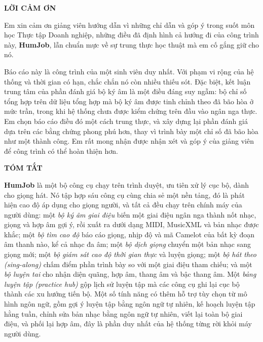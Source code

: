\documentclass[12pt,a4paper]{article}
\begin{document}
\newpage
\begin{center}
    \textbf{\large LỜI CẢM ƠN}
\end{center}

Em xin cảm ơn giảng viên hướng dẫn vì những chỉ dẫn và góp ý trong suốt môn học
Thực tập Doanh nghiệp, những điều đã định hình cả hướng đi của công trình này,
\textbf{HumJob}, lẫn chuẩn mực về sự trung thực học thuật mà em cố gắng giữ cho nó.

Báo cáo này là công trình của một sinh viên duy nhất. Với phạm vi rộng của hệ
thống và thời gian có hạn, chắc chắn nó còn nhiều thiếu sót. Đặc biệt, kết luận
trung tâm của phần đánh giá bộ ký âm là một điều đáng suy ngẫm: bộ chỉ số tổng
hợp trên dữ liệu tổng hợp mà bộ ký âm được tinh chỉnh theo đã bão hòa ở mức trần,
trong khi hệ thống chưa được kiểm chứng trên đầu vào ngân nga thực. Em chọn báo
cáo điều đó một cách trung thực, và xây dựng lại phần đánh giá dựa trên các bằng
chứng phong phú hơn, thay vì trình bày một chỉ số đã bão hòa như một thành công.
Em rất mong nhận được nhận xét và góp ý của giảng viên để công trình có thể hoàn
thiện hơn.

\newpage
\begin{center}
    \textbf{\large TÓM TẮT}
\end{center}

\textbf{HumJob} là một bộ công cụ chạy trên trình duyệt, ưu tiên xử lý cục bộ,
dành cho giọng hát. Nó tập hợp sáu công cụ cùng chia sẻ một nền tảng, đó là phát
hiện cao độ áp dụng cho giọng người, và tất cả đều chạy trên chính máy của người
dùng: một \emph{bộ ký âm giai điệu} biến một giai điệu ngân nga thành nốt nhạc,
giọng và hợp âm gợi ý, rồi xuất ra dưới dạng MIDI, MusicXML và bản nhạc được khắc;
một \emph{bộ tìm cao độ} báo cáo giọng, nhịp độ và mã Camelot của bất kỳ đoạn âm
thanh nào, kể cả nhạc đa âm; một \emph{bộ dịch giọng} chuyển một bản nhạc sang
giọng mới; một \emph{bộ giám sát cao độ thời gian thực} và luyện giọng; một
\emph{bộ hát theo (sing-along)} chấm điểm phần trình bày so với một giai điệu tham
chiếu; và một \emph{bộ luyện tai} cho nhận diện quãng, hợp âm, thang âm và bậc
thang âm. Một \emph{bảng luyện tập (practice hub)} gộp lịch sử luyện tập mà các
công cụ ghi lại cục bộ thành các xu hướng tiến bộ. Một số tính năng có thêm hỗ trợ
tùy chọn từ mô hình ngôn ngữ, gồm gợi ý luyện tập bằng ngôn ngữ tự nhiên, kế hoạch
luyện tập hằng tuần, chỉnh sửa bản nhạc bằng ngôn ngữ tự nhiên, viết lại toàn bộ
giai điệu, và phối lại hợp âm, đây là phần duy nhất của hệ thống từng rời khỏi máy
người dùng.
\end{document}
